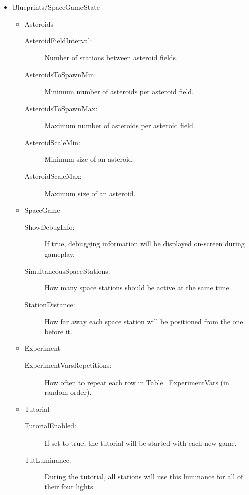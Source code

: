 \documentclass[11pt,a4paper]{article}
\begin{document}
        	\begin{itemize}
            	\item Blueprints/SpaceGameState
                \begin{itemize}
                	\item Asteroids
                    \begin{description}
                    	\item[AsteroidFieldInterval:] Number of stations between asteroid fields.
                        \item[AsteroidsToSpawnMin:] Minimum number of asteroids per asteroid field.
                        \item[AsteroidsToSpawnMax:] Maximum number of asteroids per asteroid field.
                        \item[AsteroidScaleMin:] Minimum size of an asteroid.
                        \item[AsteroidScaleMax:] Maximum size of an asteroid.
                    \end{description}
                    \item SpaceGame
                    \begin{description}
                    	\item[ShowDebugInfo:] If true, debugging information will be displayed on-screen during gameplay.
                        \item[SimultaneousSpaceStations:] How many space stations should be active at the same time.
                    	\item[StationDistance:] How far away each space station will be positioned from the one before it.
                    \end{description}
                    \item Experiment
                    \begin{description}
                    	\item[ExperimentVarsRepetitions:] How often to repeat each row in Table\_ExperimentVars (in random order).
                    \end{description}
                    \item Tutorial
                    \begin{description}
                    	\item[TutorialEnabled:] If set to true, the tutorial will be started with each new game.
                        \item[TutLuminance:] During the tutorial, all stations will use this luminance for all of their four lights.

\end{description}
\end{itemize}
\end{itemize}
\end{document}
